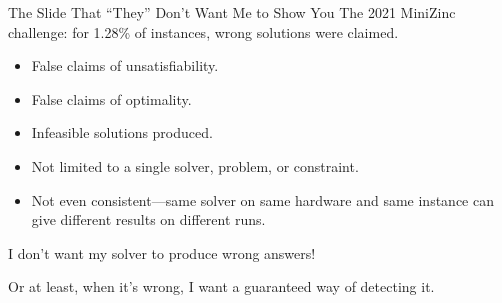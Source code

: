 \documentclass[aspectratio=169,compress,10pt]{beamer}
\begin{document}
\begin{frame}{The Slide That ``They'' Don't Want Me to Show You}
    The 2021 MiniZinc challenge: for 1.28\% of instances, wrong solutions were claimed.
    \\
    \begin{itemize}
        \item False claims of unsatisfiability.
        \item False claims of optimality.
        \item Infeasible solutions produced.
        \item Not limited to a single solver, problem, or constraint.
        \item Not even consistent---same solver on same hardware and same instance can give
            different results on different runs.
    \end{itemize}
    \bigskip
    I don't want my solver to produce wrong answers!

    \bigskip\pause

    Or at least, when it's wrong, I want a guaranteed way of detecting it.
\end{frame}
\end{document}
